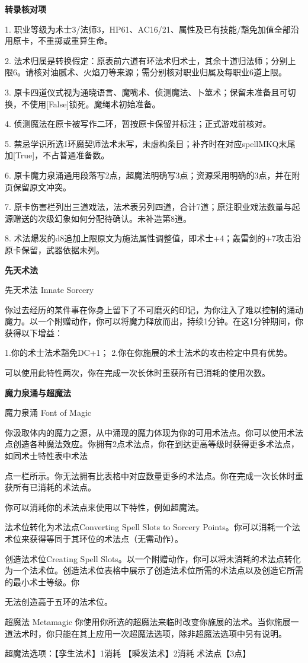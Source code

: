 \documentclass[letterpaper,openany,twoside,twocolumn]{book}
\begin{document}
\par\noindent\textbf{转录核对项}\par
1. 职业等级为术士3/法师3，HP61、AC16/21、属性及已有技能/豁免加值全部沿用原卡，不重掷或重算生命。\par
2. 法术归属是转换假定：原表前六道有环法术归术士，其余十道归法师；分别上限6。请核对油腻术、火焰刀等来源；需分别核对职业归属及每职业6道上限。\par
3. 原卡四道仪式视为通晓语言、魔嘴术、侦测魔法、卜筮术；保留未准备且可切换，不使用[False]锁死。魔绳术初始准备。\par
4. 侦测魔法在原卡被写作二环，暂按原卡保留并标注；正式游戏前核对。\par
5. 禁忌学识所选1环魔契师法术未写，未虚构条目；补齐时在对应spellMKQ末尾加[True]，不占普通准备数。\par
6. 原卡魔力泉涌通用段落写2点，超魔法明确写3点；资源采用明确的3点，并在附页保留原文冲突。\par
7. 原卡伤害栏列出三道戏法，法术表另列四道，合计7道；原注职业戏法数量与起源赠送的次级幻象如何分配待确认。未补造第8道。\par
8. 术法爆发的d8追加上限原文为施法属性调整值，即术士+4；轰雷剑的+7攻击沿原卡保留，武器依据未列。\par


\par\noindent\textbf{先天术法}\par
先天术法 Innate Sorcery\par
你过去经历的某件事在你身上留下了不可磨灭的印记，为你注入了难以控制的涌动魔力。以一个附赠动作，你可以将魔力释放而出，持续1分钟。在这1分钟期间，你获得以下增益：\par
1.你的术士法术豁免DC+1； 2.你在你施展的术士法术的攻击检定中具有优势。\par
可以使用此特性两次，你在完成一次长休时重获所有已消耗的使用次数。\par


\par\noindent\textbf{魔力泉涌与超魔法}\par
魔力泉涌 Font of Magic\par
你汲取体内的魔力之源，从中涌现的魔力体现为你的可用术法点。你可以使用术法点创造各种魔法效应。你拥有2点术法点，你在到达更高等级时获得更多术法点，如同术士特性表中术法\par
点一栏所示。你无法拥有比表格中对应数量更多的术法点。你在完成一次长休时重获所有已消耗的术法点。\par
你可以消耗你的术法点来使用以下特性，例如超魔法。\par
法术位转化为术法点Converting Spell Slots to Sorcery Points。你可以消耗一个法术位来获得等同于其环位的术法点（无需动作）。\par
创造法术位Creating Spell Slots。以一个附赠动作，你可以将未消耗的术法点转化为一个法术位。创造法术位表格中展示了创造法术位所需的术法点以及创造它所需的最小术士等级。你\par
无法创造高于五环的法术位。\par
超魔法 Metamagic 你使用你所选的超魔法来临时改变你施展的法术。当你施展一道法术时，你只能在其上应用一次超魔法选项，除非超魔法选项中另有说明。\par
超魔法选项：【孪生法术】1消耗  【瞬发法术】2消耗 术法点【3点】\par
\end{document}
